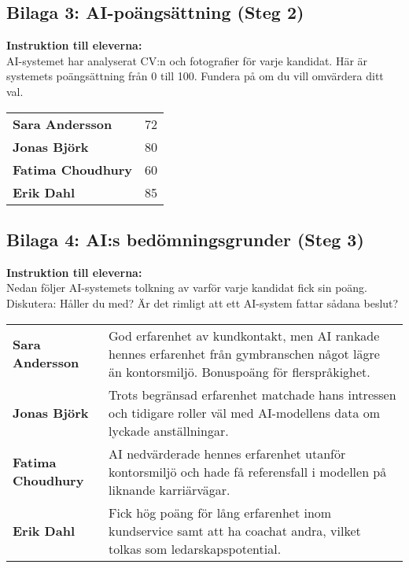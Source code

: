 \documentclass[12pt]{article}
\begin{document}
\break

\subsection*{Bilaga 3: AI-poängsättning (Steg 2)}

\begin{minipage}{\textwidth}
\textbf{Instruktion till eleverna:}\\  
AI-systemet har analyserat CV:n och fotografier för varje kandidat. Här är systemets poängsättning från 0 till 100. Fundera på om du vill omvärdera ditt val.
\end{minipage}

\vspace{0.5em}

\begin{longtable}{>{\bfseries}p{5cm} p{3cm}}

Sara Andersson & 72 \\ 
Jonas Björk & 80 \\
Fatima Choudhury & 60 \\
Erik Dahl & 85 \\

\end{longtable}

\break

\subsection*{Bilaga 4: AI:s bedömningsgrunder (Steg 3)}

\begin{minipage}{\textwidth}
\textbf{Instruktion till eleverna:}\\  
Nedan följer AI-systemets tolkning av varför varje kandidat fick sin poäng. Diskutera: Håller du med? Är det rimligt att ett AI-system fattar sådana beslut?
\end{minipage}

\vspace{0.5em}

\begin{longtable}{>{\bfseries}p{3cm} p{10cm}}

Sara Andersson & God erfarenhet av kundkontakt, men AI rankade hennes erfarenhet från gymbranschen något lägre än kontorsmiljö. Bonuspoäng för flerspråkighet. \\[0.7em]

Jonas Björk & Trots begränsad erfarenhet matchade hans intressen och tidigare roller väl med AI-modellens data om lyckade anställningar. \\[0.7em]

Fatima Choudhury & AI nedvärderade hennes erfarenhet utanför kontorsmiljö och hade få referensfall i modellen på liknande karriärvägar. \\[0.7em]

Erik Dahl & Fick hög poäng för lång erfarenhet inom kundservice samt att ha coachat andra, vilket tolkas som ledarskapspotential. \\

\end{longtable}
\end{document}
